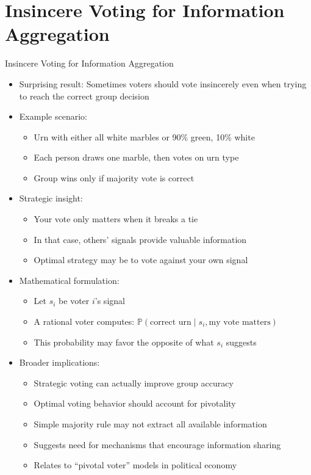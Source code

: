 \documentclass[10pt]{beamer}
\begin{document}
\section{Insincere Voting for Information Aggregation}

\begin{frame}{Insincere Voting for Information Aggregation}
  \begin{itemize}[<+->]
    \item Surprising result: Sometimes voters should vote insincerely even when trying to reach the correct group decision
    \item Example scenario:
      \begin{itemize}
        \item Urn with either all white marbles or 90\% green, 10\% white
        \item Each person draws one marble, then votes on urn type
        \item Group wins only if majority vote is correct
      \end{itemize}
    \item Strategic insight:
      \begin{itemize}
        \item Your vote only matters when it breaks a tie
        \item In that case, others' signals provide valuable information
        \item Optimal strategy may be to vote against your own signal
      \end{itemize}
    \item Mathematical formulation:
      \begin{itemize}
        \item Let $s_i$ be voter $i$'s signal
        \item A rational voter computes: $\mathbb{P}(\text{correct urn} \mid s_i, \text{my vote matters})$
        \item This probability may favor the opposite of what $s_i$ suggests
      \end{itemize}
    \item Broader implications:
      \begin{itemize}
        \item Strategic voting can actually improve group accuracy
        \item Optimal voting behavior should account for pivotality
        \item Simple majority rule may not extract all available information
        \item Suggests need for mechanisms that encourage information sharing
        \item Relates to ``pivotal voter'' models in political economy
      \end{itemize}
  \end{itemize}
\end{frame}
\end{document}
